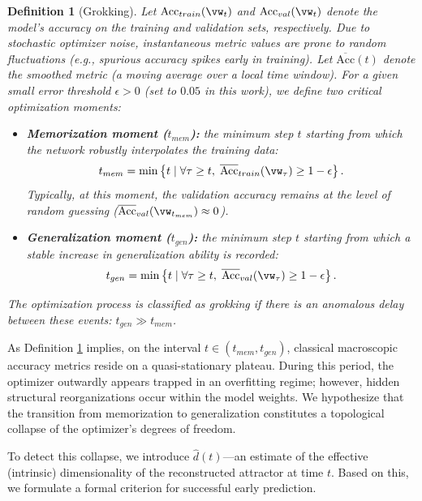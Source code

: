 \documentclass{article}
\newtheorem{definition}{Definition}
\begin{document}
\begin{definition}[Grokking]\label{def:grokking}
Let $\text{Acc}_{train}(\vw_t)$ and $\text{Acc}_{val}(\vw_t)$ denote the model's accuracy on the training and validation sets, respectively. Due to stochastic optimizer noise, instantaneous metric values are prone to random fluctuations (e.g., spurious accuracy spikes early in training). Let $\overline{\text{Acc}}(t)$ denote the smoothed metric (a moving average over a local time window). For a given small error threshold $\epsilon > 0$ (set to $0.05$ in this work), we define two critical optimization moments:
\begin{itemize}
    \item \textbf{Memorization moment ($t_{mem}$):} the minimum step $t$ starting from which the network robustly interpolates the training data:
    $$t_{mem} = \min \left\{ t \mid \forall \tau \ge t, \; \overline{\text{Acc}}_{train}(\vw_\tau) \ge 1 - \epsilon \right\}.$$
    Typically, at this moment, the validation accuracy remains at the level of random guessing ($\overline{\text{Acc}}_{val}(\vw_{t_{mem}}) \approx 0$).
    
    \item \textbf{Generalization moment ($t_{gen}$):} the minimum step $t$ starting from which a stable increase in generalization ability is recorded:
    $$t_{gen} = \min \left\{ t \mid \forall \tau \ge t, \; \overline{\text{Acc}}_{val}(\vw_\tau) \ge 1 - \epsilon \right\}.$$
\end{itemize}
The optimization process is classified as grokking if there is an anomalous delay between these events: $t_{gen} \gg t_{mem}$.
\end{definition}

As Definition \ref{def:grokking} implies, on the interval $t \in (t_{mem}, t_{gen})$, classical macroscopic accuracy metrics reside on a quasi-stationary plateau. During this period, the optimizer outwardly appears trapped in an overfitting regime; however, hidden structural reorganizations occur within the model weights. We hypothesize that the transition from memorization to generalization constitutes a topological collapse of the optimizer's degrees of freedom.

To detect this collapse, we introduce $\hat{d}(t)$—an estimate of the effective (intrinsic) dimensionality of the reconstructed attractor at time $t$. Based on this, we formulate a formal criterion for successful early prediction.
\end{document}
